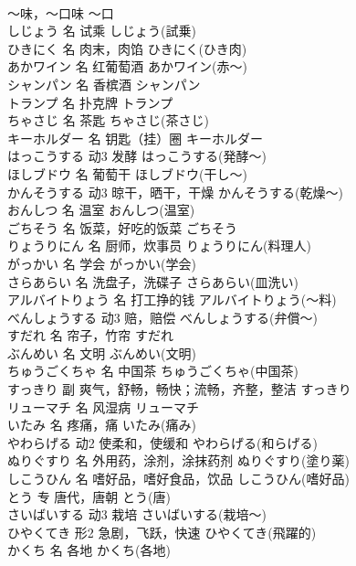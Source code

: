 \documentclass[8pt]{extreport}
\begin{document}
\begin{CJK}{UTF8}{min}
\\	～味，～口味	～口	
\\	しじょう	名	试乘	しじょう(試乗)	
\\	ひきにく	名	肉末，肉馅	ひきにく(ひき肉)	
\\	あかワイン	名	红葡萄酒	あかワイン(赤～)	
\\	シャンパン	名	香槟酒	シャンパン	
\\	トランプ	名	扑克牌	トランプ	
\\	ちゃさじ	名	茶匙	ちゃさじ(茶さじ)	
\\	キーホルダー	名	钥匙（挂）圈	キーホルダー	
\\	はっこうする	动3	发酵	はっこうする(発酵～)	
\\	ほしブドウ	名	葡萄干	ほしブドウ(干し～)	
\\	かんそうする	动3	晾干，晒干，干燥	かんそうする(乾燥～)	
\\	おんしつ	名	温室	おんしつ(温室)	
\\	ごちそう	名	饭菜，好吃的饭菜	ごちそう	
\\	りょうりにん	名	厨师，炊事员	りょうりにん(料理人)	
\\	がっかい	名	学会	がっかい(学会)	
\\	さらあらい	名	洗盘子，洗碟子	さらあらい(皿洗い)	
\\	アルバイトりょう	名	打工挣的钱	アルバイトりょう(～料)	
\\	べんしょうする	动3	赔，赔偿	べんしょうする(弁償～)	
\\	すだれ	名	帘子，竹帘	すだれ	
\\	ぶんめい	名	文明	ぶんめい(文明)	
\\	ちゅうごくちゃ	名	中国茶	ちゅうごくちゃ(中国茶)	
\\	すっきり	副	爽气，舒畅，畅快；流畅，齐整，整洁	すっきり	
\\	リューマチ	名	风湿病	リューマチ	
\\	いたみ	名	疼痛，痛	いたみ(痛み)	
\\	やわらげる	动2	使柔和，使缓和	やわらげる(和らげる)	
\\	ぬりぐすり	名	外用药，涂剂，涂抹药剂	ぬりぐすり(塗り薬)	
\\	しこうひん	名	嗜好品，嗜好食品，饮品	しこうひん(嗜好品)	
\\	とう	专	唐代，唐朝	とう(唐)	
\\	さいばいする	动3	栽培	さいばいする(栽培～)	
\\	ひやくてき	形2	急剧，飞跃，快速	ひやくてき(飛躍的)	
\\	かくち	名	各地	かくち(各地)	

\end{CJK}
\end{document}
